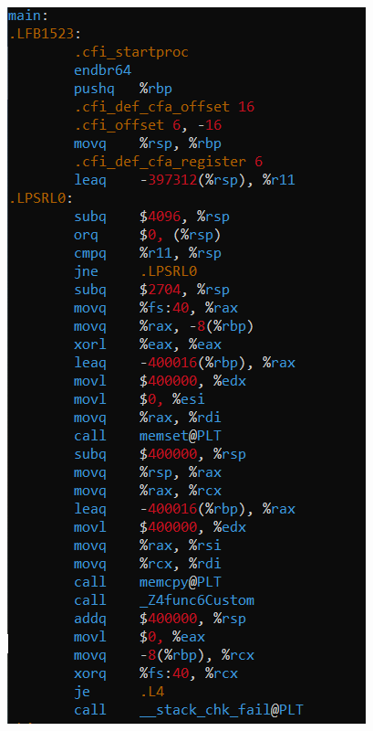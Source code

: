 \documentclass[a4paper,12pt]{article}
\begin{document}
\begin{figure}[H]
{    \begin{minipage}[t]{0.4\textwidth}
        \centering
        \includegraphics[scale = 0.44]{5aCpp64.png}
    \end{minipage}}
\end{figure}
\end{document}
